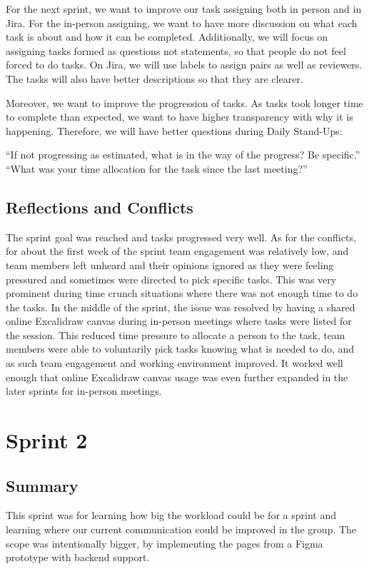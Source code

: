 For the next sprint, we want to improve our task assigning both in person and in Jira. For the in-person assigning, we want to have more discussion on what each task is about and how it can be completed. Additionally, we will focus on assigning tasks formed as questions not statements, so that people do not feel forced to do tasks. On Jira, we will use labels to assign pairs as well as reviewers. The tasks will also have better descriptions so that they are clearer.\par

Moreover, we want to improve the progression of tasks. As tasks took longer time to complete than expected, we want to have higher transparency with why it is happening. Therefore, we will have better questions during Daily Stand-Ups:
\begin{center}
“If not progressing as estimated, what is in the way of the progress? Be specific.”
“What was your time allocation for the task since the last meeting?”
\end{center}

\subsection*{Reflections and Conflicts}
The sprint goal was reached and tasks progressed very well. As for the conflicts, for about the first week of the sprint team engagement was relatively low, and team members left unheard and their opinions ignored as they were feeling pressured and sometimes were directed to pick specific tasks. This was very prominent during time crunch situations where there was not enough time to do the tasks. In the middle of the sprint, the issue was resolved by having a shared online Excalidraw canvas during in-person meetings where tasks were listed for the session. This reduced time pressure to allocate a person to the task, team members were able to voluntarily pick tasks knowing what is needed to do, and as such team engagement and working environment improved. It worked well enough that online Excalidraw canvas usage was even further expanded in the later sprints for in-person meetings.

\section{Sprint 2}
\subsection*{Summary}
This sprint was for learning how big the workload could be for a sprint and learning where our current communication could be improved in the group.
The scope was intentionally bigger, by implementing the pages from a Figma \cite{figma} prototype with backend support.

